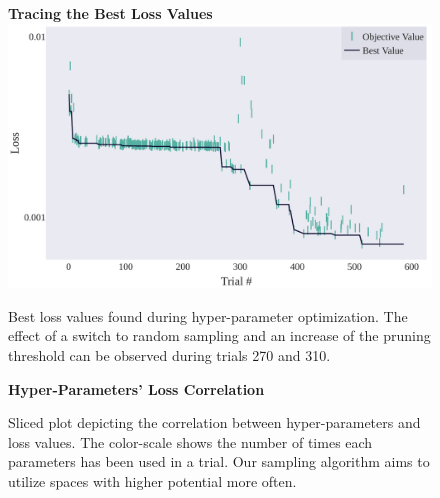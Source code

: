 \documentclass[runningheads,a4paper]{llncs}
\begin{document}
\begin{appendices}
\begin{figure}[htbp]
\centering
\textbf{Tracing the Best Loss Values}
\includegraphics[width=12cm,height=7cm]{images/Optimization_History.pdf}
\caption{Best loss values found during hyper-parameter optimization. The effect of a switch to random sampling and an increase of the pruning threshold can be observed during trials 270 and 310.}
\label{chap3:bestvalues}
\end{figure}

\begin{figure}
\begin{center}
    \textbf{Hyper-Parameters' Loss Correlation}
      \caption{Sliced plot depicting the correlation between hyper-parameters and loss values. The color-scale shows the number of times each parameters has been used in a trial. Our sampling algorithm aims to utilize spaces with higher potential more often. }
    \label{fig:slicegraph}
    \end{center}

\end{figure}


\end{appendices}
\end{document}
